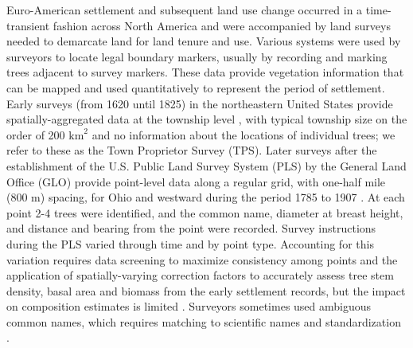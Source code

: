 \documentclass[12pt]{article}
\begin{document}
Euro-American settlement and subsequent land use change occurred in
a time-transient fashion across North America and were accompanied
by land surveys needed to demarcate land for land tenure and use.
Various systems were used by surveyors to locate legal boundary markers,
usually by recording and marking trees adjacent to survey markers.
These data provide vegetation information that can be mapped and used
quantitatively to represent the period of settlement. Early surveys
(from 1620 until 1825) in the northeastern United States provide spatially-aggregated
data at the township level \citep{Cogb:etal:2002,thompson2013four},
with typical township size on the order of 200 $\mbox{km}^{2}$ and
no information about the locations of individual trees; we refer to
these as the Town Proprietor Survey (TPS). Later surveys after the
establishment of the U.S. Public Land Survey System (PLS) by the General
Land Office (GLO) provide point-level data along a regular grid, with
one-half mile (800 m) spacing, for Ohio and westward during the period
1785 to 1907 \citep{bourdo1956review,pattison1957beginnings,schulte2001original,goring2015composition}.
At each point 2-4 trees were identified, and the common name, diameter
at breast height, and distance and bearing from the point were recorded.
Survey instructions during the PLS varied through time and by point
type. Accounting for this variation requires data screening to maximize
consistency among points and the application of spatially-varying
correction factors \citep{cogbill2015corrections,goring2015composition}
to accurately assess tree stem density, basal area and biomass from
the early settlement records, but the impact on composition estimates
is limited \citep{liu2011broadscale}. Surveyors sometimes used ambiguous
common names, which requires matching to scientific names and standardization
\citep{mladenoff2002narrowing,goring2015composition}.
\end{document}
